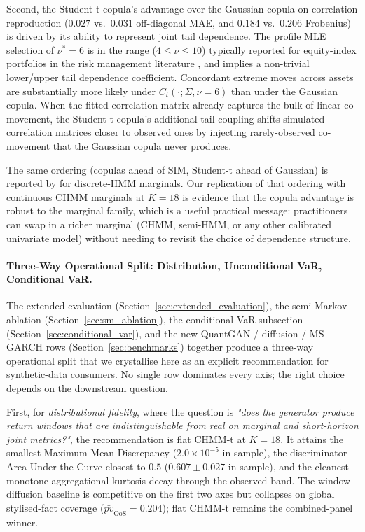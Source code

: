 Second, the Student-t copula's advantage over the Gaussian copula on correlation reproduction ($0.027$ vs.\ $0.031$ off-diagonal MAE, and $0.184$ vs.\ $0.206$ Frobenius) is driven by its ability to represent joint tail dependence.
The profile MLE selection of $\nu^* = 6$ is in the range ($4 \leq \nu \leq 10$) typically reported for equity-index portfolios in the risk management literature \cite{demarta2005tcopula, mcneil2015quantitative}, and implies a non-trivial lower/upper tail dependence coefficient.
Concordant extreme moves across assets are substantially more likely under $C_t(\cdot ; \Sigma, \nu = 6)$ than under the Gaussian copula.
When the fitted correlation matrix already captures the bulk of linear co-movement, the Student-t copula's additional tail-coupling shifts simulated correlation matrices closer to observed ones by injecting rarely-observed co-movement that the Gaussian copula never produces.

The same ordering (copulas ahead of SIM, Student-t ahead of Gaussian) is reported by \citet{alswaidan2026hybrid} for discrete-HMM marginals.
Our replication of that ordering with continuous CHMM marginals at $K = 18$ is evidence that the copula advantage is robust to the marginal family, which is a useful practical message: practitioners can swap in a richer marginal (CHMM, semi-HMM, or any other calibrated univariate model) without needing to revisit the choice of dependence structure.

\paragraph{Three-Way Operational Split: Distribution, Unconditional VaR, Conditional VaR.}
The extended evaluation (Section~\ref{sec:extended_evaluation}), the semi-Markov ablation (Section~\ref{sec:sm_ablation}), the conditional-VaR subsection (Section~\ref{sec:conditional_var}), and the new QuantGAN / diffusion / MS-GARCH rows (Section~\ref{sec:benchmarks}) together produce a three-way operational split that we crystallise here as an explicit recommendation for synthetic-data consumers.
No single row dominates every axis; the right choice depends on the downstream question.

First, for \emph{distributional fidelity}, where the question is \emph{"does the generator produce return windows that are indistinguishable from real on marginal and short-horizon joint metrics?"}, the recommendation is flat CHMM-t at $K = 18$.
It attains the smallest Maximum Mean Discrepancy ($2.0 \times 10^{-5}$ in-sample), the discriminator Area Under the Curve closest to $0.5$ ($0.607 \pm 0.027$ in-sample), and the cleanest monotone aggregational kurtosis decay through the observed band.
The window-diffusion baseline is competitive on the first two axes but collapses on global stylised-fact coverage ($\bar{pv}_{\text{OoS}} = 0.204$); flat CHMM-t remains the combined-panel winner.

